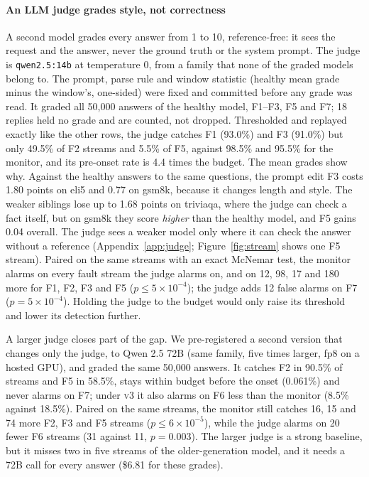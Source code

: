 \documentclass[11pt]{article}
\newcommand{\vthree}{\textsc{v3}}
\begin{document}
\paragraph{An LLM judge grades style, not correctness}
\label{sec:judge}
A second model grades every answer from 1 to 10, reference-free: it sees the
request and the answer, never the ground truth or the system prompt. The judge is
\texttt{qwen2.5:14b} at temperature 0, from a family that none of the graded
models belong to. The prompt, parse rule and window statistic (healthy mean grade
minus the window's, one-sided) were fixed and committed before any grade was read.
It graded all 50{,}000 answers of the healthy model, F1--F3, F5 and F7; 18 replies
held no grade and are counted, not dropped. Thresholded and replayed exactly like
the other rows, the judge catches F1 (93.0\%) and F3 (91.0\%) but only 49.5\% of
F2 streams and 5.5\% of F5, against 98.5\% and 95.5\% for the monitor, and its
pre-onset rate is 4.4 times the budget. The mean grades show why. Against the
healthy answers to the same questions, the prompt edit F3 costs 1.80 points on
\textsf{eli5} and 0.77 on \textsf{gsm8k}, because it changes length and style. The
weaker siblings lose up to 1.68 points on \textsf{triviaqa}, where the judge can
check a fact itself, but on \textsf{gsm8k} they score \emph{higher} than the healthy
model, and F5 gains 0.04 overall. The judge sees a weaker model only where it can
check the answer without a reference (Appendix~\ref{app:judge};
Figure~\ref{fig:stream} shows one F5 stream). Paired on the same streams with an
exact McNemar test, the monitor alarms on every fault stream the judge alarms on,
and on 12, 98, 17 and 180 more for F1, F2, F3 and F5 ($p\le 5\times10^{-4}$); the
judge adds 12 false alarms on F7 ($p=5\times10^{-4}$). Holding the judge to the
budget would only raise its threshold and lower its detection further.

A larger judge closes part of the gap. We pre-registered a second version that
changes only the judge, to Qwen 2.5 72B (same family, five times larger, fp8 on a
hosted GPU), and graded the same 50{,}000 answers. It catches F2 in 90.5\% of
streams and F5 in 58.5\%, stays within budget before the onset (0.061\%) and never
alarms on F7; under \vthree{} it also alarms on F6 less than the monitor (8.5\%
against 18.5\%). Paired on the same streams, the monitor still catches 16, 15 and
74 more F2, F3 and F5 streams ($p\le 6\times10^{-5}$), while the judge alarms on
20 fewer F6 streams (31 against 11, $p=0.003$). The larger judge is a strong
baseline, but it misses two in five streams of the older-generation model, and it
needs a 72B call for every answer (\$6.81 for these grades).
\end{document}
